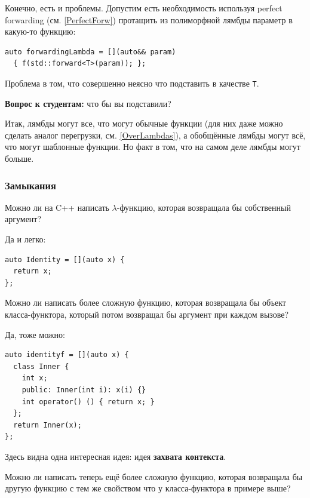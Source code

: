 \documentclass[a4paper,12pt,oneside]{article}
\newif\ifanswers
\begin{document}
Конечно, есть и проблемы. Допустим есть необходимость используя perfect forwarding (см. \ref{PerfectForw}) протащить из полиморфной лямбды параметр в какую-то функцию:

\begin{lstlisting}
auto forwardingLambda = [](auto&& param) 
  { f(std::forward<T>(param)); };
\end{lstlisting}

Проблема в том, что совершенно неясно что подставить в качестве \lstinline!T!.

\textbf{Вопрос к студентам:} что бы вы подставили?

\ifanswers
Правильный ответ: \lstinline!decltype(param)!. Этот ответ основан на механике \lstinline!std::forward! как условного перемещения. Если \lstinline!T! подходит для выбора, то и \lstinline!T&&! тоже подходит.
\fi

Итак, лямбды могут все, что могут обычные функции (для них даже можно сделать аналог перегрузки, см. \ref{OverLambdas}), а обобщённые лямбды могут всё, что могут шаблонные функции. Но факт в том, что на самом деле лямбды могут больше.

\subsubsection{Замыкания}\label{Closures}

Можно ли на C++ написать $\lambda$-функцию, которая возвращала бы собственный аргумент? 

Да и легко:

\begin{lstlisting}
auto Identity = [](auto x) {
  return x;
};
\end{lstlisting}

Можно ли написать более сложную функцию, которая возвращала бы объект класса-функтора, который потом возвращал бы аргумент при каждом вызове? 

Да, тоже можно:

\begin{lstlisting}
auto identityf = [](auto x) {
  class Inner {
    int x;
    public: Inner(int i): x(i) {}
    int operator() () { return x; }
  };
  return Inner(x);
};
\end{lstlisting}

Здесь видна одна интересная идея: идея \textbf{захвата контекста}. 

Можно ли написать теперь ещё более сложную функцию, которая возвращала бы другую функцию с тем же свойством что у класса-функтора в примере выше? 
\end{document}

